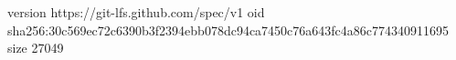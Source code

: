 version https://git-lfs.github.com/spec/v1
oid sha256:30c569ec72c6390b3f2394ebb078dc94ca7450c76a643fc4a86c774340911695
size 27049
